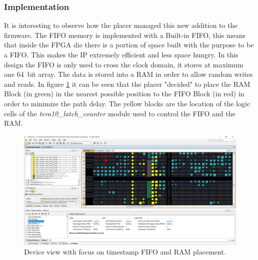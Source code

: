 \subsubsection{Implementation}
\noindent It is interesting to observe how the placer managed this new addition to the firmware. The FIFO memory is implemented with a Built-in FIFO, this means that inside the FPGA die there is a portion of space built with the purpose to be a FIFO. This makes the IP extremely efficient and less space hungry.
In this design the FIFO is only used to cross the clock domain, it stores at maximum one 64~bit array. The data is stored into a RAM in order to allow random writes and reads.
In figure \ref{fig:fifonearram} it can be seen that the placer "decided" to place the RAM Block (in green) in the nearest possible position to the FIFO Block (in red) in order to minimize the path delay.
The yellow blocks are the location of the logic cells of the \textit{tera10\_latch\_counter} module used to control the FIFO and the RAM.
\begin{figure}[H]
	\centering
	\includegraphics[width=0.95\linewidth]{IMG/ch4/FIFOnearRAM}
	\caption{Device view with focus on timestamp FIFO and RAM placement.}
	\label{fig:fifonearram}
\end{figure}

